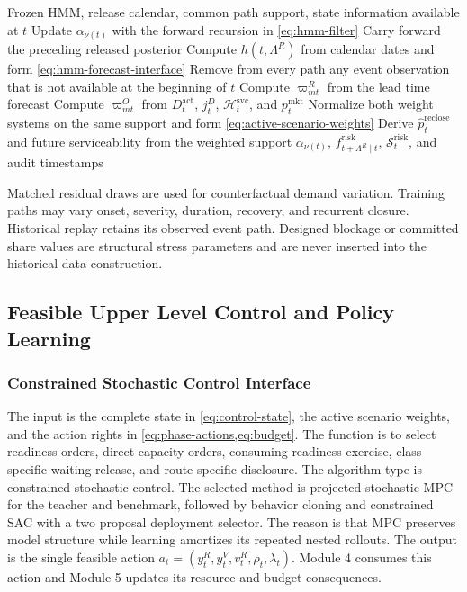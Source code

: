 \documentclass[a4paper,fleqn]{cas-sc}
\begin{document}
\begin{algorithm}[t]
\caption{Released risk and common scenario construction}
\label{alg:risk-scenarios}
\begin{algorithmic}[1]
\Require Frozen HMM, release calendar, common path support, state information available at $t$
  \State Update $\alpha_{\nu(t)}$ with the forward recursion in \cref{eq:hmm-filter}
\Else
  \State Carry forward the preceding released posterior
\EndIf
\State Compute $h(t,\Lambda^R)$ from calendar dates and form \cref{eq:hmm-forecast-interface}
\State Remove from every path any event observation that is not available at the beginning of $t$
\State Compute $\varpi^R_{mt}$ from the lead time forecast
\State Compute $\varpi^O_{mt}$ from $D_t^{\mathrm{act}}$, $j_t^D$, $\mathcal H_t^{\mathrm{svc}}$, and $p_t^{\mathrm{mkt}}$
\State Normalize both weight systems on the same support and form \cref{eq:active-scenario-weights}
\State Derive $\widehat p_t^{\mathrm{reclose}}$ and future serviceability from the weighted support
\State \Return $\alpha_{\nu(t)}$, $f^{\mathrm{risk}}_{t+\Lambda^R\mid t}$, $\mathcal S_t^{\mathrm{risk}}$, and audit timestamps
\end{algorithmic}
\end{algorithm}

Matched residual draws are used for counterfactual demand variation. Training
paths may vary onset, severity, duration, recovery, and recurrent closure.
Historical replay retains its observed event path. Designed blockage or
committed share values are structural stress parameters and are never inserted
into the historical data construction.

\subsection{Feasible Upper Level Control and Policy Learning}
\label{subsec:policy-learning}

\subsubsection{Constrained Stochastic Control Interface}
The input is the complete state in \cref{eq:control-state}, the active scenario
weights, and the action rights in \cref{eq:phase-actions,eq:budget}. The
function is to select readiness orders, direct capacity orders, consuming
readiness exercise, class specific waiting release, and route specific
disclosure. The algorithm type is constrained stochastic control. The selected
method is projected stochastic MPC for the teacher and benchmark, followed by
behavior cloning and constrained SAC with a two proposal deployment selector.
The reason is that MPC preserves model structure while learning amortizes its
repeated nested rollouts. The output is the single feasible action
$a_t=(y_t^R,y_t^V,v_t^R,\rho_t,\lambda_t)$. Module 4 consumes this action and
Module 5 updates its resource and budget consequences.
\end{document}
